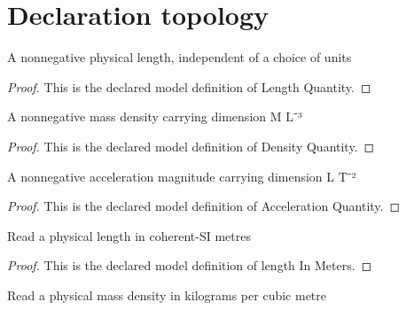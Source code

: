 \section{Declaration topology}
\begin{definition}
  \label{def:physics:phyx-mini-0725:phyxminiproblems-problemphyxmini0725-lengthquantity}
  A nonnegative physical length, independent of a choice of units
\end{definition}
\begin{proof}
  This is the declared model definition of Length Quantity.
\end{proof}
\begin{definition}
  \label{def:physics:phyx-mini-0725:phyxminiproblems-problemphyxmini0725-densityquantity}
  A nonnegative mass density carrying dimension M L⁻³
\end{definition}
\begin{proof}
  This is the declared model definition of Density Quantity.
\end{proof}
\begin{definition}
  \label{def:physics:phyx-mini-0725:phyxminiproblems-problemphyxmini0725-accelerationquantity}
  A nonnegative acceleration magnitude carrying dimension L T⁻²
\end{definition}
\begin{proof}
  This is the declared model definition of Acceleration Quantity.
\end{proof}
\begin{definition}
  \label{def:physics:phyx-mini-0725:phyxminiproblems-problemphyxmini0725-lengthinmeters}
  Read a physical length in coherent-SI metres
\end{definition}
\begin{proof}
  This is the declared model definition of length In Meters.
\end{proof}
\begin{definition}
  \label{def:physics:phyx-mini-0725:phyxminiproblems-problemphyxmini0725-densityinkilogramspercubicmeter}
  Read a physical mass density in kilograms per cubic metre
\end{definition}
